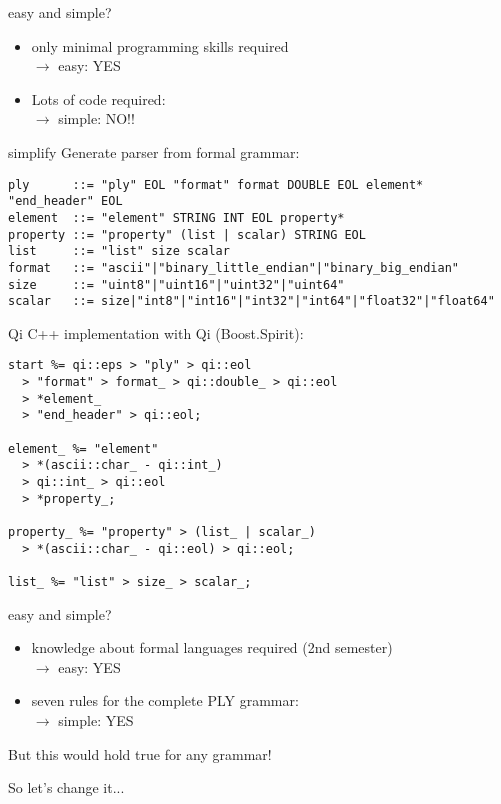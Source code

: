 \documentclass[paper=screen,orient=landscape,style=simple]{powerdot}
\begin{document}
\begin{slide}{easy and simple?}
\begin{itemize}
  \item only minimal programming skills required\\
        $\rightarrow$ easy: YES
  \item Lots of code required:\\
        $\rightarrow$ simple: NO!!
\end{itemize}
\end{slide}

\begin{slide}[method=file]{simplify}
Generate parser from formal grammar:

\begin{lstlisting}
ply      ::= "ply" EOL "format" format DOUBLE EOL element* "end_header" EOL
element  ::= "element" STRING INT EOL property*
property ::= "property" (list | scalar) STRING EOL
list     ::= "list" size scalar
format   ::= "ascii"|"binary_little_endian"|"binary_big_endian"
size     ::= "uint8"|"uint16"|"uint32"|"uint64"
scalar   ::= size|"int8"|"int16"|"int32"|"int64"|"float32"|"float64"
\end{lstlisting}
\end{slide}

\begin{slide}[method=file]{Qi}
C++ implementation with Qi (Boost.Spirit):

\begin{lstlisting}
start %= qi::eps > "ply" > qi::eol
  > "format" > format_ > qi::double_ > qi::eol
  > *element_
  > "end_header" > qi::eol;

element_ %= "element"
  > *(ascii::char_ - qi::int_)
  > qi::int_ > qi::eol
  > *property_;

property_ %= "property" > (list_ | scalar_)
  > *(ascii::char_ - qi::eol) > qi::eol;

list_ %= "list" > size_ > scalar_;
\end{lstlisting}
\end{slide}

\begin{slide}{easy and simple?}
\begin{itemize}
  \item knowledge about formal languages required (2nd semester)\\
        $\rightarrow$ easy: YES
  \item seven rules for the complete PLY grammar:\\
        $\rightarrow$ simple: YES
\end{itemize}

But this would hold true for any grammar!

So let's change it...
\end{slide}
\end{document}
